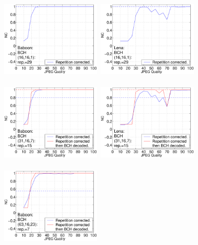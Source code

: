 \documentclass[12pt]{report}
\begin{document}
\begin{figure}[p]
\setlength{\abovecaptionskip}{-0.25cm}
\centerline{ \hbox{
\includegraphics[height=3.81cm,width=4.8cm]{EPS_BK_formattedBetter/JPGbab16.eps}
\includegraphics[height=3.81cm,width=4.8cm]{EPS_BK_formattedBetter/JPGlen16.eps}\\
}}
\centerline{ \hbox{
\includegraphics[height=3.81cm,width=4.8cm]{EPS_BK_formattedBetter/JPGbab31.eps}
\includegraphics[height=3.81cm,width=4.8cm]{EPS_BK_formattedBetter/JPGlen31.eps}\\
}}
\centerline{ \hbox{
\includegraphics[height=3.81cm,width=4.8cm]{EPS_BK_formattedBetter/JPGbab63.eps}
}}
\end{figure}
\end{document}
